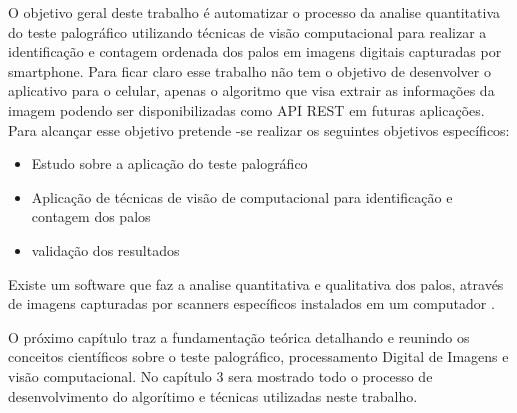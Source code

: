 O objetivo geral deste trabalho é automatizar o processo da analise quantitativa do teste palográfico utilizando técnicas de visão computacional para realizar a identificação e contagem ordenada dos palos em imagens digitais capturadas por smartphone. Para ficar claro esse trabalho não tem o objetivo de desenvolver o aplicativo para o celular, apenas o algoritmo que visa extrair as informações da imagem podendo  ser disponibilizadas como API REST em futuras aplicações. Para alcançar esse objetivo pretende -se realizar os seguintes objetivos específicos:
\begin{itemize}
\item Estudo sobre a aplicação do teste palográfico
\item Aplicação de técnicas de visão de computacional para identificação e contagem dos palos
\item validação dos resultados
\end{itemize}

Existe um software \cite{skip2018} que faz a analise quantitativa e qualitativa dos palos, através de imagens capturadas por scanners específicos  instalados em um computador .

O próximo capítulo traz a fundamentação teórica detalhando e reunindo os conceitos científicos sobre o teste palográfico, processamento Digital de Imagens e visão computacional. No capítulo 3 sera mostrado todo o processo de desenvolvimento do algorítimo e técnicas utilizadas neste trabalho.
